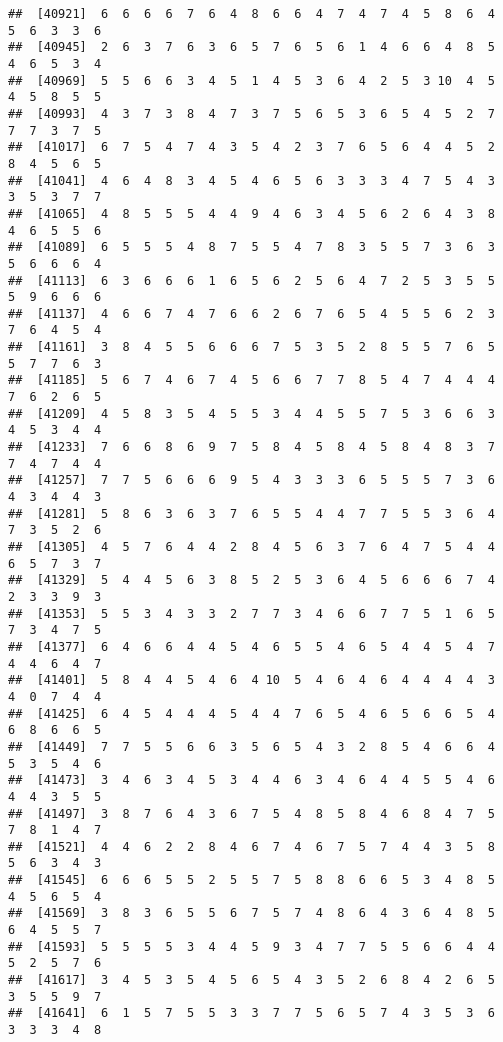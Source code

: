 \documentclass[
]{book}
\begin{document}
\begin{verbatim}
##  [40921]  6  6  6  6  7  6  4  8  6  6  4  7  4  7  4  5  8  6  4  5  6  3  3  6
##  [40945]  2  6  3  7  6  3  6  5  7  6  5  6  1  4  6  6  4  8  5  4  6  5  3  4
##  [40969]  5  5  6  6  3  4  5  1  4  5  3  6  4  2  5  3 10  4  5  4  5  8  5  5
##  [40993]  4  3  7  3  8  4  7  3  7  5  6  5  3  6  5  4  5  2  7  7  7  3  7  5
##  [41017]  6  7  5  4  7  4  3  5  4  2  3  7  6  5  6  4  4  5  2  8  4  5  6  5
##  [41041]  4  6  4  8  3  4  5  4  6  5  6  3  3  3  4  7  5  4  3  3  5  3  7  7
##  [41065]  4  8  5  5  5  4  4  9  4  6  3  4  5  6  2  6  4  3  8  4  6  5  5  6
##  [41089]  6  5  5  5  4  8  7  5  5  4  7  8  3  5  5  7  3  6  3  5  6  6  6  4
##  [41113]  6  3  6  6  6  1  6  5  6  2  5  6  4  7  2  5  3  5  5  5  9  6  6  6
##  [41137]  4  6  6  7  4  7  6  6  2  6  7  6  5  4  5  5  6  2  3  7  6  4  5  4
##  [41161]  3  8  4  5  5  6  6  6  7  5  3  5  2  8  5  5  7  6  5  5  7  7  6  3
##  [41185]  5  6  7  4  6  7  4  5  6  6  7  7  8  5  4  7  4  4  4  7  6  2  6  5
##  [41209]  4  5  8  3  5  4  5  5  3  4  4  5  5  7  5  3  6  6  3  4  5  3  4  4
##  [41233]  7  6  6  8  6  9  7  5  8  4  5  8  4  5  8  4  8  3  7  7  4  7  4  4
##  [41257]  7  7  5  6  6  6  9  5  4  3  3  3  6  5  5  5  7  3  6  4  3  4  4  3
##  [41281]  5  8  6  3  6  3  7  6  5  5  4  4  7  7  5  5  3  6  4  7  3  5  2  6
##  [41305]  4  5  7  6  4  4  2  8  4  5  6  3  7  6  4  7  5  4  4  6  5  7  3  7
##  [41329]  5  4  4  5  6  3  8  5  2  5  3  6  4  5  6  6  6  7  4  2  3  3  9  3
##  [41353]  5  5  3  4  3  3  2  7  7  3  4  6  6  7  7  5  1  6  5  7  3  4  7  5
##  [41377]  6  4  6  6  4  4  5  4  6  5  5  4  6  5  4  4  5  4  7  4  4  6  4  7
##  [41401]  5  8  4  4  5  4  6  4 10  5  4  6  4  6  4  4  4  4  3  4  0  7  4  4
##  [41425]  6  4  5  4  4  4  5  4  4  7  6  5  4  6  5  6  6  5  4  6  8  6  6  5
##  [41449]  7  7  5  5  6  6  3  5  6  5  4  3  2  8  5  4  6  6  4  5  3  5  4  6
##  [41473]  3  4  6  3  4  5  3  4  4  6  3  4  6  4  4  5  5  4  6  4  4  3  5  5
##  [41497]  3  8  7  6  4  3  6  7  5  4  8  5  8  4  6  8  4  7  5  7  8  1  4  7
##  [41521]  4  4  6  2  2  8  4  6  7  4  6  7  5  7  4  4  3  5  8  5  6  3  4  3
##  [41545]  6  6  6  5  5  2  5  5  7  5  8  8  6  6  5  3  4  8  5  4  5  6  5  4
##  [41569]  3  8  3  6  5  5  6  7  5  7  4  8  6  4  3  6  4  8  5  6  4  5  5  7
##  [41593]  5  5  5  5  3  4  4  5  9  3  4  7  7  5  5  6  6  4  4  5  2  5  7  6
##  [41617]  3  4  5  3  5  4  5  6  5  4  3  5  2  6  8  4  2  6  5  3  5  5  9  7
##  [41641]  6  1  5  7  5  5  3  3  7  7  5  6  5  7  4  3  5  3  6  3  3  3  4  8

\end{verbatim}
\end{document}
